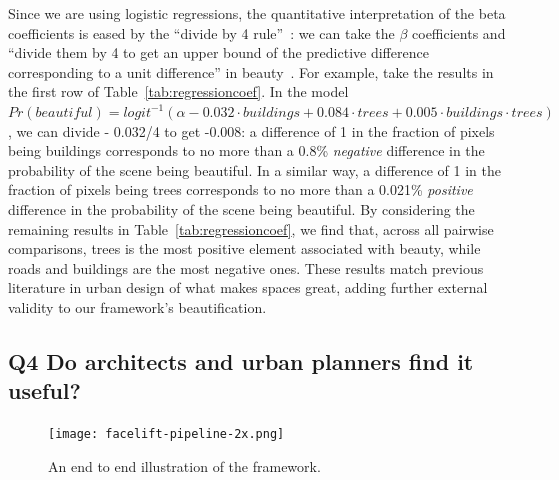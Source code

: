 Since we are using logistic regressions, the quantitative interpretation of the beta coefficients is eased by the ``divide by 4 rule''~\cite{vaughn2008data}: we can take the $\beta$ coefficients and ``divide them by 4 to get an upper bound of the predictive difference corresponding to a unit difference'' in beauty~\cite{vaughn2008data}. For example, take the results in the first row of Table~\ref{tab:regressioncoef}. In the model $Pr(beautiful) = logit^{-1}(\alpha - 0.032 \cdot buildings + 0.084 \cdot trees + 0.005 \cdot  buildings \cdot trees)$, we can divide - 0.032/4 to get -0.008: a difference of 1 in the fraction of pixels being buildings corresponds to no more than a 0.8\% \emph{negative} difference in the probability of the scene being beautiful. In a similar way, a difference of 1 in the fraction of pixels being trees corresponds to no more than a 0.021\% \emph{positive} difference in the probability of the scene being beautiful. By considering the remaining results in Table~\ref{tab:regressioncoef}, we find that, across all pairwise comparisons, trees is the most positive element associated with beauty, while roads and buildings are the most negative ones. These results match previous literature in urban design of what makes spaces great, adding further external validity to our framework's beautification. 




\subsection{Q4 Do architects and urban planners find it useful?}

\begin{figure}[ht]
    \centering
    \texttt{[image: facelift-pipeline-2x.png]}
    \caption{An end to end illustration of the framework.}
    \label{fig:framework}
\end{figure}


\begin{table}[t!]
    \centering
    \caption{Urban experts polled about the extent to which the interactive map visualization promotes: (a) decision making; (b) citizen participation in urban planning; and (c) promotion of green cities}
    \label{tab:useCases}
    \vspace{-10mm}
\end{table}


